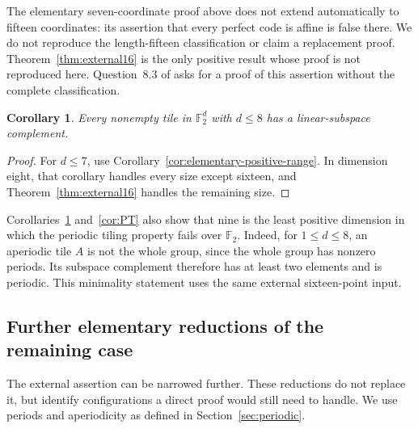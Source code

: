 \documentclass[11pt]{article}
\numberwithin{equation}{section}
\newtheorem{corollary}[theorem]{Corollary}
\theoremstyle{definition}
\theoremstyle{remark}\newtheorem{remark}[theorem]{Remark}
\newcommand{\F}{\mathbb F_2}
\begin{document}
The elementary seven-coordinate proof above does not extend automatically
to fifteen coordinates: its assertion that every perfect code is affine
is false there. We do not reproduce the length-fifteen classification or
claim a replacement proof. Theorem~\ref{thm:external16} is the only
positive result whose proof is not reproduced here.
Question~8.3 of \cite{FI} asks for a proof of this assertion without
the complete classification.

\begin{corollary}\label{cor:positive8}
Every nonempty tile in $\F^d$ with $d\le8$ has a linear-subspace complement.
\end{corollary}
\begin{proof}
For $d\le7$, use Corollary~\ref{cor:elementary-positive-range}.
In dimension eight, that corollary handles every size except sixteen,
and Theorem~\ref{thm:external16} handles the remaining size.
\end{proof}

Corollaries~\ref{cor:positive8} and~\ref{cor:PT} also show that nine
is the least positive dimension in which the periodic tiling property
fails over $\F$. Indeed, for $1\le d\le8$, an aperiodic tile $A$ is not
the whole group, since the whole group has nonzero periods. Its subspace
complement therefore has at least two elements and is periodic.
This minimality statement uses the same external sixteen-point input.

\subsection{Further elementary reductions of the remaining case}
The external assertion can be narrowed further. These reductions do not
replace it, but identify configurations a direct proof would still need
to handle. We use periods and aperiodicity as defined in
Section~\ref{sec:periodic}.
\end{document}
